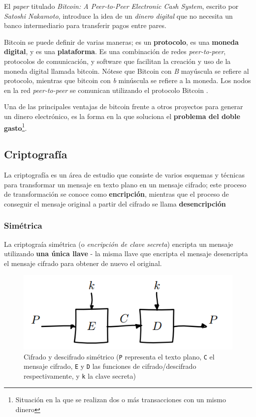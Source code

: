 El \emph{paper} titulado \emph{Bitcoin: A Peer-to-Peer Electronic Cash System}, escrito por \emph{Satoshi Nakamoto}, introduce la idea de un \emph{dinero digital} que no necesita un banco intermediario para transferir pagos entre pares.

Bitcoin se puede definir de varias maneras; es un \textbf{protocolo}, es una \textbf{moneda digital}, y es una \textbf{plataforma}. Es una combinación de redes \emph{peer-to-peer}, protocolos de comunicación, y software que facilitan la creación y uso de la moneda digital llamada bitcoin. Nótese que Bitcoin con \emph{B} mayúscula se refiere al protocolo, mientras que bitcoin con \emph{b} minúscula se refiere a la moneda. Los nodos en la red \emph{peer-to-peer} se comunican utilizando el protocolo Bitcoin \autocite{MasteringBlockchainBitcoin}.  

Una de las principales ventajas de bitcoin frente a otros proyectos para generar un dinero electrónico, es la forma en la que soluciona el \textbf{problema del doble gasto}\footnote{Situación en la que se realizan dos o más transacciones con un mismo dinero}.

\subsection{Criptografía}

La criptografía es un área de estudio que consiste de varios esquemas y técnicas para transformar un mensaje en texto plano en un mensaje cifrado; este proceso de transformación se conoce como \textbf{encripción}, mientras que el proceso de conseguir el mensaje original a partir del cifrado se llama \textbf{desencripción} \autocite{StallingsCryptography}

\subsubsection{Simétrica}

La criptograía simétrica (o \emph{encripción de clave secreta}) encripta un mensaje utilizando \textbf{una única llave} - la misma llave que encripta el mensaje desencripta el mensaje cifrado para obtener de nuevo el original. 

\begin{figure}[H]
    \centering
    \includegraphics[width=0.8\linewidth]{images/van-houvten-simetrico.png}
    \caption*{Cifrado y descifrado simétrico (\texttt{P} representa el texto plano, \texttt{C} el mensaje cifrado, \texttt{E} y \texttt{D} las funciones de cifrado/descifrado respectivamente, y \texttt{k} la clave secreta) \autocite{VanhouvtenBlockCiphers}}
\end{figure}

